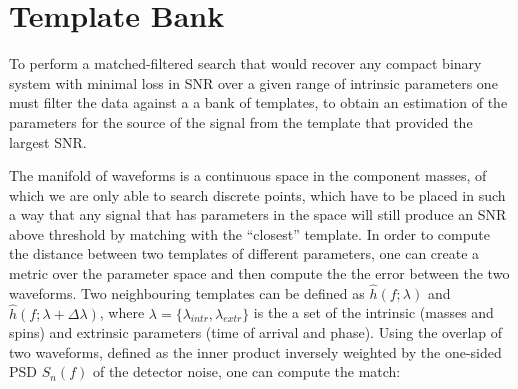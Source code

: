 \documentclass[binding=0.6cm, LaM]{sapthesis}
\begin{document}
%	
%
%
%
%
%

\section{Template Bank}


	To perform a matched-filtered search that would recover any compact binary system 	
	with minimal loss in SNR over a given range of intrinsic parameters 
	one must filter the data against a a bank of templates, 
	to obtain an estimation of the parameters for the source of the signal 
	from the template that provided the largest SNR.
	

	The manifold of waveforms is a continuous space in the component masses, 
	of which we are only able to search discrete points, 
	which have to be placed in such a way that any signal
	that has parameters in the space will still produce an SNR 
	above threshold by matching with the “closest” template. 
	In order to compute the distance between two templates of different parameters, 
	one can create a metric over the parameter space and then compute the the error between the two waveforms.
	Two neighbouring templates can be defined as $\hat h(f;\lambda)$ and $\hat h(f;\lambda + \Delta \lambda)$,
	where $\lambda = \{\lambda_{intr}, \lambda_{extr}\}$ is the a set of 
	the intrinsic (masses and spins) and extrinsic parameters (time of arrival and phase).
	Using the overlap of two waveforms, defined as the inner product inversely weighted 
	by the one-sided PSD $S_n(f)$ of the detector noise, one can compute the match:
\end{document}
